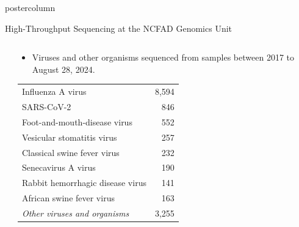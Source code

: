 \documentclass[final]{beamer}
\begin{document}
\begin{frame}
\begin{columns}
\begin{column}{.5\textwidth}
\begin{beamercolorbox}[center,wd=\textwidth]{postercolumn}
\begin{minipage}[T]{.95\textwidth}
{  \begin{block}{High-Throughput Sequencing at the NCFAD Genomics Unit}
    \begin{columns}
    
    \begin{column}{.01\textwidth}
    \end{column}
    
    \begin{column}{.45\textwidth}
      \begin{itemize}
        \item Viruses and other organisms sequenced from samples between 2017 to August 28, 2024.
      \end{itemize}
      \parbox[t]{\textwidth}{
      \begin{table}
      \begin{tabular}{l r}
      Influenza A virus & 8,594 \\
      SARS-CoV-2 & 846 \\
      Foot-and-mouth-disease virus & 552 \\
      Vesicular stomatitis virus & 257 \\
      Classical swine fever virus & 232 \\
      Senecavirus A virus & 190 \\
      Rabbit hemorrhagic disease virus & 141 \\
      African swine fever virus & 163 \\
      \emph{Other viruses and organisms} & 3,255 \\
      \end{tabular}
      

\end{table}}
\end{column}
\end{columns}
\end{block}}
\end{minipage}
\end{beamercolorbox}
\end{column}
\end{columns}
\end{frame}
\end{document}
